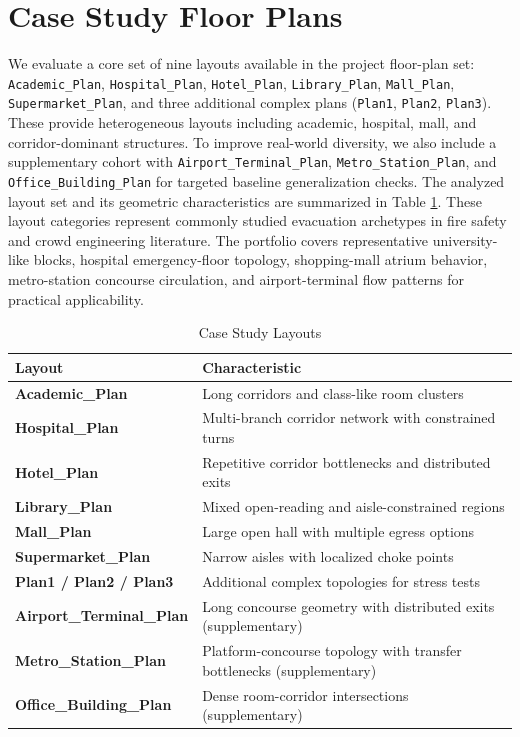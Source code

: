 \documentclass[journal]{IEEEtran}
\begin{document}
\section{Case Study Floor Plans}
We evaluate a core set of nine layouts available in the project floor-plan set: \texttt{Academic\_Plan}, \texttt{Hospital\_Plan}, \texttt{Hotel\_Plan}, \texttt{Library\_Plan}, \texttt{Mall\_Plan}, \texttt{Supermarket\_Plan}, and three additional complex plans (\texttt{Plan1}, \texttt{Plan2}, \texttt{Plan3}). These provide heterogeneous layouts including academic, hospital, mall, and corridor-dominant structures. To improve real-world diversity, we also include a supplementary cohort with \texttt{Airport\_Terminal\_Plan}, \texttt{Metro\_Station\_Plan}, and \texttt{Office\_Building\_Plan} for targeted baseline generalization checks. The analyzed layout set and its geometric characteristics are summarized in Table \ref{tab:layouts}.
These layout categories represent commonly studied evacuation archetypes in fire safety and crowd engineering literature.
The portfolio covers representative university-like blocks, hospital emergency-floor topology, shopping-mall atrium behavior, metro-station concourse circulation, and airport-terminal flow patterns for practical applicability.

\begin{table}[t]
\centering
\caption{Case Study Layouts}
\label{tab:layouts}
\begin{tabular}{>{\bfseries}l p{4.8cm}}
\toprule
Layout & Characteristic \\
\midrule
Academic\_Plan & Long corridors and class-like room clusters \\
Hospital\_Plan & Multi-branch corridor network with constrained turns \\
Hotel\_Plan & Repetitive corridor bottlenecks and distributed exits \\
Library\_Plan & Mixed open-reading and aisle-constrained regions \\
Mall\_Plan & Large open hall with multiple egress options \\
Supermarket\_Plan & Narrow aisles with localized choke points \\
Plan1 / Plan2 / Plan3 & Additional complex topologies for stress tests \\
Airport\_Terminal\_Plan & Long concourse geometry with distributed exits (supplementary) \\
Metro\_Station\_Plan & Platform-concourse topology with transfer bottlenecks (supplementary) \\
Office\_Building\_Plan & Dense room-corridor intersections (supplementary) \\
\bottomrule
\end{tabular}
\end{table}
\end{document}
